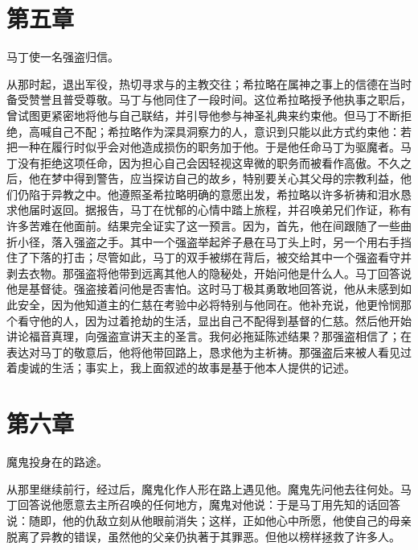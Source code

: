
\section{第五章}

马丁使一名强盗归信。\par

从那时起，退出军役，热切寻求与的主教交往；希拉略在属神之事上的信德在当时备受赞誉且普受尊敬。马丁与他同住了一段时间。这位希拉略授予他执事之职后，曾试图更紧密地将他与自己联结，并引导他参与神圣礼典来约束他。但马丁不断拒绝，高喊自己不配；希拉略作为深具洞察力的人，意识到只能以此方式约束他：若把一种在履行时似乎会对他造成损伤的职务加于他。于是他任命马丁为驱魔者。马丁没有拒绝这项任命，因为担心自己会因轻视这卑微的职务而被看作高傲。不久之后，他在梦中得到警告，应当探访自己的故乡，特别要关心其父母的宗教利益，他们仍陷于异教之中。他遵照圣希拉略明确的意愿出发，希拉略以许多祈祷和泪水恳求他届时返回。据报告，马丁在忧郁的心情中踏上旅程，并召唤弟兄们作证，称有许多苦难在他面前。结果完全证实了这一预言。因为，首先，他在间跟随了一些曲折小径，落入强盗之手。其中一个强盗举起斧子悬在马丁头上时，另一个用右手挡住了下落的打击；尽管如此，马丁的双手被绑在背后，被交给其中一个强盗看守并剥去衣物。那强盗将他带到远离其他人的隐秘处，开始问他是什么人。马丁回答说他是基督徒。强盗接着问他是否害怕。这时马丁极其勇敢地回答说，他从未感到如此安全，因为他知道主的仁慈在考验中必将特别与他同在。他补充说，他更怜悯那个看守他的人，因为过着抢劫的生活，显出自己不配得到基督的仁慈。然后他开始讲论福音真理，向强盗宣讲天主的圣言。我何必拖延陈述结果？那强盗相信了；在表达对马丁的敬意后，他将他带回路上，恳求他为主祈祷。那强盗后来被人看见过着虔诚的生活；事实上，我上面叙述的故事是基于他本人提供的记述。\par


\section{第六章}

魔鬼投身在的路途。\par

从那里继续前行，经过后，魔鬼化作人形在路上遇见他。魔鬼先问他去往何处。马丁回答说他愿意去主所召唤的任何地方，魔鬼对他说：于是马丁用先知的话回答说：随即，他的仇敌立刻从他眼前消失；这样，正如他心中所愿，他使自己的母亲脱离了异教的错误，虽然他的父亲仍执著于其罪恶。但他以榜样拯救了许多人。\par

